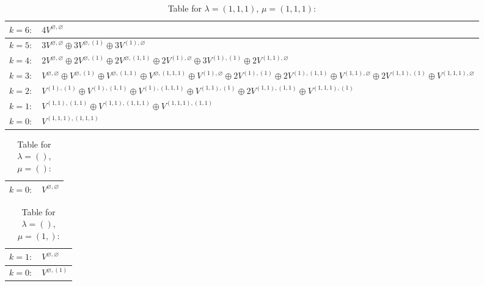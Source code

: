 \renewcommand{\arraystretch}{1.6} 
\begin{table}[H]
\centering
\caption{Table for $\lambda = (1, 1, 1)$, $\mu = (1, 1, 1)$:}
\begin{tabular}{|>{\centering\arraybackslash}p{15cm}|}
\hline
 $k = 6: \quad 4 V^{\varnothing, \varnothing} $ \\ \hline
 $k = 5: \quad 3 V^{\varnothing, \varnothing} \oplus 3 V^{\varnothing, (1)} \oplus 3 V^{(1), \varnothing} $ \\ \hline
 $k = 4: \quad 2 V^{\varnothing, \varnothing} \oplus 2 V^{\varnothing, (1)} \oplus 2 V^{\varnothing, (1, 1)} \oplus 2 V^{(1), \varnothing} \oplus 3 V^{(1), (1)} \oplus 2 V^{(1, 1), \varnothing} $ \\ \hline
 $k = 3: \quad V^{\varnothing, \varnothing} \oplus V^{\varnothing, (1)} \oplus V^{\varnothing, (1, 1)} \oplus V^{\varnothing, (1, 1, 1)} \oplus V^{(1), \varnothing} \oplus 2 V^{(1), (1)} \oplus 2 V^{(1), (1, 1)} \oplus V^{(1, 1), \varnothing} \oplus 2 V^{(1, 1), (1)} \oplus V^{(1, 1, 1), \varnothing} $ \\ \hline
 $k = 2: \quad V^{(1), (1)} \oplus V^{(1), (1, 1)} \oplus V^{(1), (1, 1, 1)} \oplus V^{(1, 1), (1)} \oplus 2 V^{(1, 1), (1, 1)} \oplus V^{(1, 1, 1), (1)} $ \\ \hline
 $k = 1: \quad V^{(1, 1), (1, 1)} \oplus V^{(1, 1), (1, 1, 1)} \oplus V^{(1, 1, 1), (1, 1)} $ \\ \hline
 $k = 0: \quad V^{(1, 1, 1), (1, 1, 1)} $ \\ \hline
\end{tabular}
\end{table}

\renewcommand{\arraystretch}{1.6} 
\begin{table}[H]
\centering
\caption{Table for $\lambda = ()$, $\mu = ()$:}
\begin{tabular}{|>{\centering\arraybackslash}p{15cm}|}
\hline
 $k = 0: \quad V^{\varnothing, \varnothing} $ \\ \hline
\end{tabular}
\end{table}

\renewcommand{\arraystretch}{1.6} 
\begin{table}[H]
\centering
\caption{Table for $\lambda = ()$, $\mu = (1,)$:}
\begin{tabular}{|>{\centering\arraybackslash}p{15cm}|}
\hline
 $k = 1: \quad V^{\varnothing, \varnothing} $ \\ \hline
 $k = 0: \quad V^{\varnothing, (1)} $ \\ \hline
\end{tabular}
\end{table}

